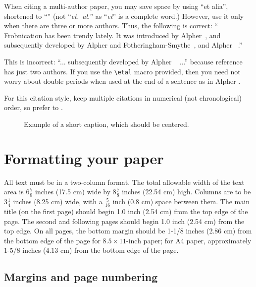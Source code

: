 \documentclass[10pt,twocolumn,letterpaper]{article}
\begin{document}
When citing a multi-author paper, you may save space by using ``et alia'',
shortened to ``\etal'' (not ``{\em et.\ al.}'' as ``{\em et}'' is a complete word.)
However, use it only when there are three or more authors.  Thus, the
following is correct: ``
   Frobnication has been trendy lately.
   It was introduced by Alpher~\cite{Alpher02}, and subsequently developed by
   Alpher and Fotheringham-Smythe~\cite{Alpher03}, and Alpher \etal~\cite{Alpher04}.''

This is incorrect: ``... subsequently developed by Alpher \etal~\cite{Alpher03} ...''
because reference~\cite{Alpher03} has just two authors.  If you use the
\verb'\etal' macro provided, then you need not worry about double periods
when used at the end of a sentence as in Alpher \etal.

For this citation style, keep multiple citations in numerical (not
chronological) order, so prefer \cite{Alpher03,Alpher02,Authors14} to
\cite{Alpher02,Alpher03,Authors14}.


\begin{figure*}
\begin{center}
\fbox{\rule{0pt}{2in} \rule{.9\linewidth}{0pt}}
\end{center}
   \caption{Example of a short caption, which should be centered.}
\label{fig:short}
\end{figure*}

\section{Formatting your paper}

All text must be in a two-column format. The total allowable width of the
text area is $6\frac78$ inches (17.5 cm) wide by $8\frac78$ inches (22.54
cm) high. Columns are to be $3\frac14$ inches (8.25 cm) wide, with a
$\frac{5}{16}$ inch (0.8 cm) space between them. The main title (on the
first page) should begin 1.0 inch (2.54 cm) from the top edge of the
page. The second and following pages should begin 1.0 inch (2.54 cm) from
the top edge. On all pages, the bottom margin should be 1-1/8 inches (2.86
cm) from the bottom edge of the page for $8.5 \times 11$-inch paper; for A4
paper, approximately 1-5/8 inches (4.13 cm) from the bottom edge of the
page.

\subsection{Margins and page numbering}
\end{document}
